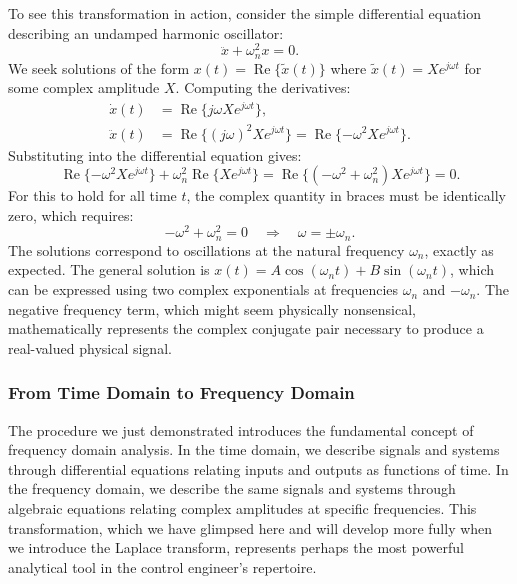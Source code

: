 To see this transformation in action, consider the simple differential equation describing an undamped harmonic oscillator:
\begin{equation}
\ddot{x} + \omega_n^2 x = 0.
\end{equation}
We seek solutions of the form $x(t) = \operatorname{Re}\{\tilde{x}(t)\}$ where $\tilde{x}(t) = X e^{j\omega t}$ for some complex amplitude $X$. Computing the derivatives:
\begin{align}
\dot{x}(t) &= \operatorname{Re}\{j\omega X e^{j\omega t}\}, \\
\ddot{x}(t) &= \operatorname{Re}\{(j\omega)^2 X e^{j\omega t}\} = \operatorname{Re}\{-\omega^2 X e^{j\omega t}\}.
\end{align}
Substituting into the differential equation gives:
\begin{equation}
\operatorname{Re}\{-\omega^2 X e^{j\omega t}\} + \omega_n^2 \operatorname{Re}\{X e^{j\omega t}\} = \operatorname{Re}\{(-\omega^2 + \omega_n^2) X e^{j\omega t}\} = 0.
\end{equation}
For this to hold for all time $t$, the complex quantity in braces must be identically zero, which requires:
\begin{equation}
-\omega^2 + \omega_n^2 = 0 \quad\Rightarrow\quad \omega = \pm\omega_n.
\end{equation}
The solutions correspond to oscillations at the natural frequency $\omega_n$, exactly as expected. The general solution is $x(t) = A\cos(\omega_n t) + B\sin(\omega_n t)$, which can be expressed using two complex exponentials at frequencies $\omega_n$ and $-\omega_n$. The negative frequency term, which might seem physically nonsensical, mathematically represents the complex conjugate pair necessary to produce a real-valued physical signal.

\subsubsection{From Time Domain to Frequency Domain}

The procedure we just demonstrated introduces the fundamental concept of frequency domain analysis. In the time domain, we describe signals and systems through differential equations relating inputs and outputs as functions of time. In the frequency domain, we describe the same signals and systems through algebraic equations relating complex amplitudes at specific frequencies. This transformation, which we have glimpsed here and will develop more fully when we introduce the Laplace transform, represents perhaps the most powerful analytical tool in the control engineer's repertoire.

